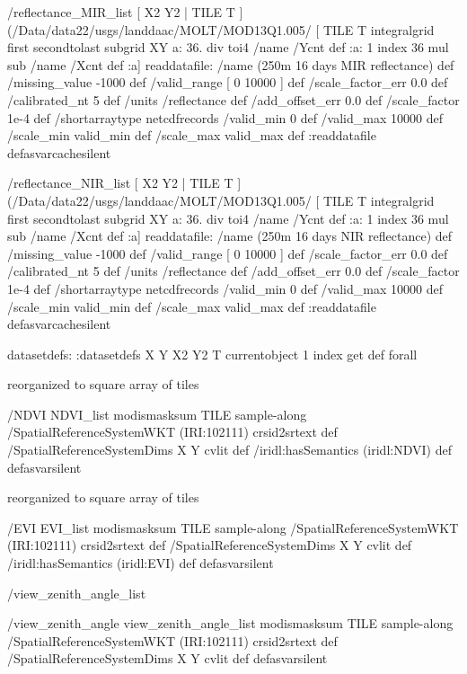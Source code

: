 \begin{ingrid}
/reflectance_MIR_list
{
[ X2 Y2 | TILE T ]
(/Data/data22/usgs/landdaac/MOLT/MOD13Q1.005/%
 [ TILE T integralgrid first secondtolast subgrid
XY
  a:
    36. div
    toi4
    /name /Ycnt def
    :a: 1 index
      36 mul
      sub
     /name /Xcnt def
     :a]
readdatafile:
/name (250m 16 days MIR reflectance) def
 /missing_value -1000 def
 /valid_range [ 0 10000 ] def
 /scale_factor_err 0.0 def
  /calibrated_nt 5 def
 /units /reflectance def
 /add_offset_err 0.0 def
 /scale_factor 1e-4 def
/shortarraytype netcdfrecords
/valid_min 0 def
/valid_max 10000 def
/scale_min valid_min def
/scale_max valid_max def
:readdatafile
} defasvarcachesilent
\end{ingrid}
\begin{ingrid}
/reflectance_NIR_list
{
[ X2 Y2 | TILE T ]
(/Data/data22/usgs/landdaac/MOLT/MOD13Q1.005/%
 [ TILE T integralgrid first secondtolast subgrid
XY
  a:
    36. div
    toi4
    /name /Ycnt def
    :a: 1 index
      36 mul
      sub
     /name /Xcnt def
     :a]
readdatafile:
/name (250m 16 days NIR reflectance) def
 /missing_value -1000 def
 /valid_range [ 0 10000 ] def
 /scale_factor_err 0.0 def
  /calibrated_nt 5 def
 /units /reflectance def
 /add_offset_err 0.0 def
 /scale_factor 1e-4 def
/shortarraytype netcdfrecords
/valid_min 0 def
/valid_max 10000 def
/scale_min valid_min def
/scale_max valid_max def
:readdatafile
} defasvarcachesilent
\end{ingrid}
\begin{ingrid}
datasetdefs:
:datasetdefs
{ X Y X2 Y2 T } { currentobject 1 index get def } forall
\end{ingrid}
reorganized to square array of tiles
\begin{ingrid}
/NDVI
{NDVI_list
   modismasksum TILE sample-along
/SpatialReferenceSystemWKT (IRI:102111) crsid2srtext def
/SpatialReferenceSystemDims { X Y } cvlit  def
/iridl:hasSemantics (iridl:NDVI) def
} defasvarsilent
\end{ingrid}
reorganized to square array of tiles
\begin{ingrid}
/EVI
{EVI_list
   modismasksum TILE sample-along
/SpatialReferenceSystemWKT (IRI:102111) crsid2srtext def
/SpatialReferenceSystemDims { X Y } cvlit def
/iridl:hasSemantics (iridl:EVI) def
} defasvarsilent
\end{ingrid}
/view_zenith_angle_list
\begin{ingrid}
/view_zenith_angle
{view_zenith_angle_list
   modismasksum TILE sample-along
/SpatialReferenceSystemWKT (IRI:102111) crsid2srtext def
/SpatialReferenceSystemDims { X Y } cvlit def
} defasvarsilent
\end{ingrid}
